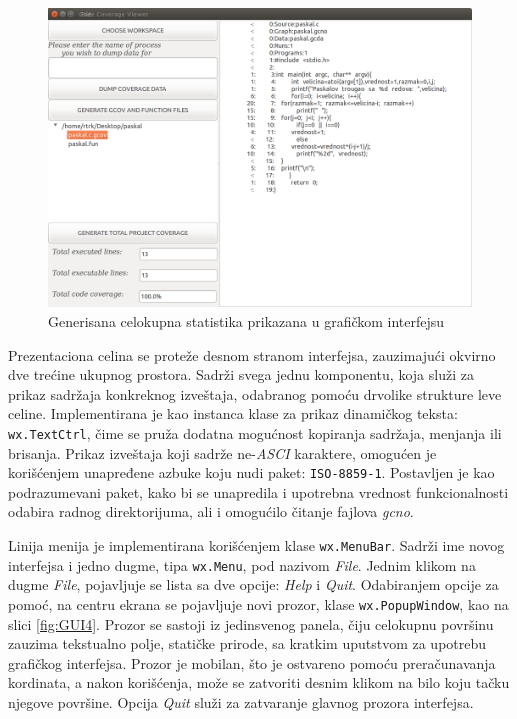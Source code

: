 \documentclass[12pt,oneside]{memoir}
\newcommand{\kod}[1]{\texttt{#1}}
\newcommand{\strano}[1]{\textit{#1}}
\begin{document}
\begin{figure}[!ht]
  \centering
  \includegraphics[width=\textwidth]{img/GUI_3_ng.png}
  \caption{Generisana celokupna statistika prikazana u grafičkom interfejsu}
  \label{fig:GUI3}
\end{figure}

Prezentaciona celina se proteže desnom stranom interfejsa, zauzimajući okvirno dve trećine ukupnog prostora. Sadrži svega jednu komponentu, koja služi za prikaz sadržaja konkreknog izveštaja, odabranog pomoću drvolike strukture leve celine. Implementirana je kao instanca klase za prikaz dinamičkog teksta: \kod{wx.TextCtrl}, čime se pruža dodatna mogućnost kopiranja sadržaja, menjanja ili brisanja. Prikaz izveštaja koji sadrže ne-\strano{ASCI} karaktere, omogućen je korišćenjem unapređene azbuke koju nudi paket: \kod{ISO-8859-1}. Postavljen je kao podrazumevani paket, kako bi se unapredila i upotrebna vrednost funkcionalnosti odabira radnog direktorijuma, ali i omogućilo čitanje fajlova \strano{gcno}. 

Linija menija je implementirana korišćenjem klase \kod{wx.MenuBar}. Sadrži ime novog interfejsa i jedno dugme, tipa \kod{wx.Menu}, pod nazivom \strano{File}. Jednim klikom na dugme \strano{File}, pojavljuje se lista sa dve opcije: \strano{Help} i \strano{Quit}. Odabiranjem opcije za pomoć, na centru ekrana se pojavljuje novi prozor, klase \kod{wx.PopupWindow}, kao na slici \ref{fig:GUI4}. Prozor se sastoji iz jedinsvenog panela, čiju celokupnu površinu zauzima tekstualno polje, statičke prirode, sa kratkim uputstvom za upotrebu grafičkog interfejsa. Prozor je mobilan, što je ostvareno pomoću preračunavanja kordinata, a nakon korišćenja, može se zatvoriti desnim klikom na bilo koju tačku njegove površine. Opcija \strano{Quit} služi za zatvaranje glavnog prozora interfejsa.
\end{document}
